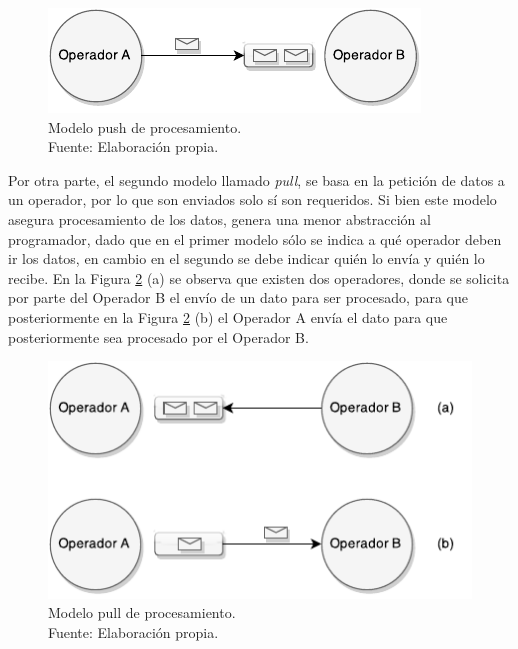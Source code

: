 \begin{figure}[ht!]
  \centering
    \includegraphics[scale=1]{images/SPS-Push.pdf}
  \caption[Modelo push de procesamiento.]{Modelo push de procesamiento.\\Fuente: Elaboraci\'on propia.}
  \label{fig:sps-push}
\end{figure}

Por otra parte, el segundo modelo llamado \textit{pull}, se basa en la petici\'on de datos a un operador, por lo que son enviados solo s\'i son requeridos. Si bien este modelo asegura procesamiento de los datos, genera una menor abstracci\'on al programador, dado que en el primer modelo s\'olo se indica a \normalsize{qu\'e} operador deben ir los datos, en cambio en el segundo se debe indicar qui\'en lo env\'ia y qui\'en lo recibe. En la Figura \ref{fig:sps-pull} (a) se observa que existen dos operadores, donde se solicita por parte del Operador B el env\'io de un dato para ser procesado, para que posteriormente en la Figura \ref{fig:sps-pull} (b) el Operador A env\'ia el dato para que posteriormente sea procesado por el Operador B.

\begin{figure}[ht!]
  \centering
    \includegraphics[scale=1]{images/SPS-Pull.pdf}
  \caption[Modelo pull de procesamiento.]{Modelo pull de procesamiento.\\Fuente: Elaboraci\'on propia.}
  \label{fig:sps-pull}
\end{figure}

